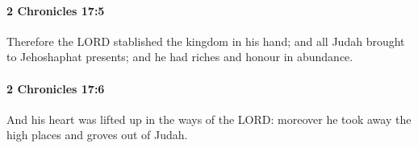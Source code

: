 		\paragraph{2 Chronicles 17:5} %
			\label{2CHRONICLES-17-5}

			Therefore the LORD stablished the kingdom in his hand; and all Judah brought to Jehoshaphat presents; and he had riches and honour in abundance.


		\paragraph{2 Chronicles 17:6} %
			\label{2CHRONICLES-17-6}

			And his heart was lifted up in the ways of the LORD: moreover he took away the high places and groves out of Judah.


